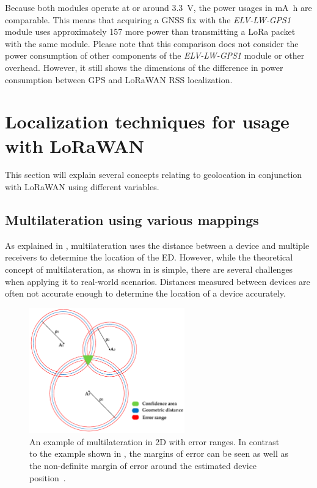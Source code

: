 Because both modules operate at or around \SI{3.3}{\volt}, the power usages in \si{\milli\ampere\hour} are comparable.
This means that acquiring a \ac{GNSS} fix with the \emph{ELV-LW-GPS1} module uses approximately \SI{157}{\times} more power than transmitting a \ac{LoRa} packet with the same module.
Please note that this comparison does not consider the power consumption of other components of  the \emph{ELV-LW-GPS1} module or other overhead.
However, it still shows the dimensions of the difference in power consumption between \ac{GPS} and \ac{LoRaWAN} \ac{RSS} localization.

\section{Localization techniques for usage with \acs{LoRaWAN}}\label{sec:lorawan-localization-techniques}

This section will explain several concepts relating to geolocation in conjunction with \ac{LoRaWAN} using different variables.

\subsection{Multilateration using various mappings}\label{sec:lorawan-multilateration}

As explained in , multilateration uses the distance between a device and multiple receivers to determine the location of the \acl{ED}.
However, while the theoretical concept of multilateration, as shown in  is simple, there are several challenges when applying it to real-world scenarios.
Distances measured between devices are often not accurate enough to determine the location of a device accurately.

\begin{figure}[htbp]
    \centering
    \includegraphics[width=0.6\textwidth]{pictures/multilateration/multilateration_error_ranges.png}
    \caption[Example of multilateration in 2D with error ranges]{
        An example of multilateration in 2D with error ranges.
        In contrast to the example shown in , the margins of error can be seen as well as the non-definite margin of error around the estimated device position~\protect\cite{kapoor_novel_2016}.
    }\label{pic:multilateration-with-error-ranges-example}
\end{figure}

